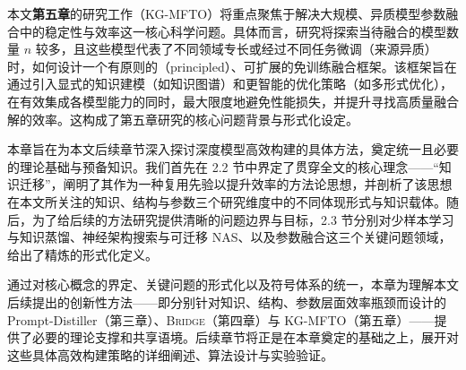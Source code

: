 \documentclass[../main.tex]{subfiles}
\begin{document}
本文\textbf{第五章}的研究工作（KG-MFTO）将重点聚焦于解决大规模、异质模型参数融合中的稳定性与效率这一核心科学问题。具体而言，研究将探索当待融合的模型数量 $n$ 较多，且这些模型代表了不同领域专长或经过不同任务微调（来源异质）时，如何设计一个有原则的（principled）、可扩展的免训练融合框架。该框架旨在通过引入显式的知识建模（如知识图谱）和更智能的优化策略（如多形式优化），在有效集成各模型能力的同时，最大限度地避免性能损失，并提升寻找高质量融合解的效率。这构成了第五章研究的核心问题背景与形式化设定。


本章旨在为本文后续章节深入探讨深度模型高效构建的具体方法，奠定统一且必要的理论基础与预备知识。我们首先在 2.2 节中界定了贯穿全文的核心理念——“知识迁移”，阐明了其作为一种复用先验以提升效率的方法论思想，并剖析了该思想在本文所关注的知识、结构与参数三个研究维度中的不同体现形式与知识载体。随后，为了给后续的方法研究提供清晰的问题边界与目标，2.3 节分别对少样本学习与知识蒸馏、神经架构搜索与可迁移 NAS、以及参数融合这三个关键问题领域，给出了精炼的形式化定义。

通过对核心概念的界定、关键问题的形式化以及符号体系的统一，本章为理解本文后续提出的创新性方法——即分别针对知识、结构、参数层面效率瓶颈而设计的 Prompt-Distiller（第三章）、\textsc{Bridge}（第四章）与 KG-MFTO（第五章）——提供了必要的理论支撑和共享语境。后续章节将正是在本章奠定的基础之上，展开对这些具体高效构建策略的详细阐述、算法设计与实验验证。
\end{document}
